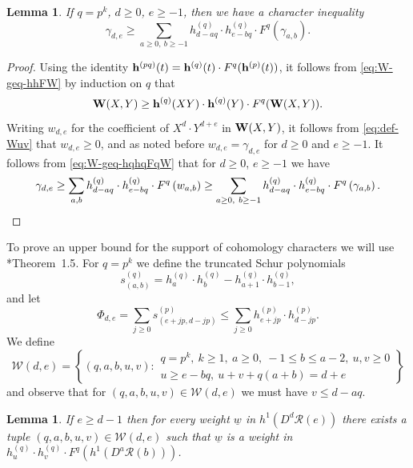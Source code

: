 \documentclass[11pt,reqno]{amsart}
\newcommand{\defi}[1]{{\upshape\sffamily #1}}
\newcommand{\bh}{{\bf h}}
\newcommand{\bW}{{\bf W}}
\newcommand{\mc}[1]{\mathcal{#1}}
\newcommand{\ul}[1]{\underline{#1}}
\newtheorem{lemma}[theorem]{Lemma}
\theoremstyle{definition}
\theoremstyle{remark}
\numberwithin{equation}{section}
\begin{document}
\begin{lemma}\label{lem:bound-h1}
    If $q=p^k$, $d\geq 0$, $e\geq -1$, then we have a character inequality
    \[\gamma_{d,e} \geq \sum_{a\geq 0,\ b\geq -1}h^{(q)}_{d-aq}\cdot h^{(q)}_{e-bq}\cdot F^q\left(\gamma_{a,b}\right).\]
\end{lemma}

\begin{proof} Using the identity $\bh^{(pq)}(t)=\bh^{(q)}(t)\cdot F^q(\bh^{(p)}(t))$, it follows from \eqref{eq:W-geq-hhFW} by induction on $q$ that
\begin{equation}\label{eq:W-geq-hqhqFqW}
\bW(X,Y) \geq \bh^{(q)}(XY)\cdot \bh^{(q)}(Y)\cdot F^q(\bW(X,Y)).
\end{equation}
Writing $w_{d,e}$ for the coefficient of $X^d\cdot Y^{d+e}$ in $\bW(X,Y)$, it follows from \eqref{eq:def-Wuv} that $w_{d,e} \geq 0$, and as noted before $w_{d,e}=\gamma_{d,e}$ for $d\geq 0$ and $e\geq -1$. It follows from \eqref{eq:W-geq-hqhqFqW} that for $d\geq 0$, $e\geq -1$ we have
\[\gamma_{d,e}\geq \sum_{a,b}h^{(q)}_{d-aq}\cdot h^{(q)}_{e-bq}\cdot F^q\left(w_{a,b}\right) \geq \sum_{a\geq 0,\ b\geq -1}h^{(q)}_{d-aq}\cdot h^{(q)}_{e-bq}\cdot F^q\left(\gamma_{a,b}\right).    \qedhere\]
\end{proof}

To prove an upper bound for the support of cohomology characters we will use \cite{KMRR}*{Theorem~1.5}. For $q=p^k$ we define the
\defi{truncated Schur polynomials}
\begin{equation}\label{eq:def-trunc-sab} s^{(q)}_{(a,b)} = h^{(q)}_a\cdot h^{(q)}_b-h^{(q)}_{a+1}\cdot h^{(q)}_{b-1},
\end{equation}
and let
\begin{equation}\label{eq:def-Phi-de} 
\Phi_{d,e} = \sum_{j\geq 0} s^{(p)}_{(e+jp,d-jp)} \leq \sum_{j\geq 0} h^{(p)}_{e+jp}\cdot h^{(p)}_{d-jp}.
\end{equation}
We define
\begin{equation}\label{eq:def-W-de}
\mc{W}(d,e) = 
\left\{
 (q,a,b,u,v):
 \begin{array}{l}
 q=p^k,\ k\geq 1,\ a\geq0,\ -1\leq b\leq a-2,\
 u,v\geq 0\\ u\geq e-bq,\
 u+v+q(a+b)=d+e
 \end{array}
 \right\} 
\end{equation}
and observe that for $(q,a,b,u,v)\in\mc{W}(d,e)$ we must have $v\leq d-aq$.

\begin{lemma}\label{lem:upbd-H1DdRe}
    If $e\geq d-1$ then for every weight $\ul{w}$ in $h^1(D^d\mc{R}(e))$ there exists a tuple $(q,a,b,u,v)\in\mc{W}(d,e)$ such that $\ul{w}$ is a weight in $h^{(q)}_u\cdot h^{(q)}_v \cdot F^q\left(h^1(D^a\mc{R}(b))\right)$.
\end{lemma}
\end{document}
